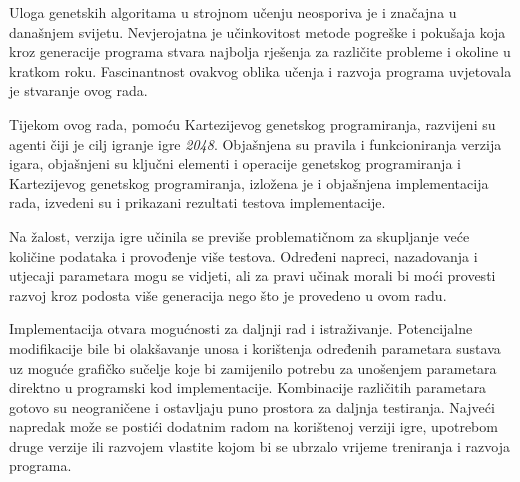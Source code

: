 \quad Uloga genetskih algoritama u strojnom učenju neosporiva je i značajna u današnjem svijetu. Nevjerojatna je učinkovitost  metode pogreške i pokušaja koja kroz generacije programa stvara najbolja rješenja za različite probleme i okoline u kratkom roku. Fascinantnost ovakvog oblika učenja i razvoja programa uvjetovala je stvaranje ovog rada. 
\par 
Tijekom ovog rada, pomoću Kartezijevog genetskog programiranja, razvijeni su agenti čiji je cilj igranje igre \textit{2048}. Objašnjena su pravila i funkcioniranja verzija igara, objašnjeni su ključni elementi i operacije genetskog programiranja i Kartezijevog genetskog programiranja, izložena je i objašnjena implementacija rada, izvedeni su i prikazani rezultati testova implementacije.
\par 
Na žalost, verzija igre učinila se previše problematičnom za skupljanje veće količine podataka i provođenje više testova. Određeni napreci, nazadovanja i utjecaji parametara mogu se vidjeti, ali za pravi učinak morali bi moći provesti razvoj kroz podosta više generacija nego što je provedeno u ovom radu. 
\par
Implementacija otvara mogućnosti za daljnji rad i istraživanje. Potencijalne modifikacije bile bi olakšavanje unosa i korištenja određenih parametara sustava uz moguće grafičko sučelje koje bi zamijenilo potrebu za unošenjem parametara direktno u programski kod implementacije. Kombinacije različitih parametara gotovo su neograničene i ostavljaju puno prostora za daljnja testiranja. Najveći napredak može se postići dodatnim radom na korištenoj verziji igre, upotrebom druge verzije ili razvojem vlastite kojom bi se ubrzalo vrijeme treniranja i razvoja programa. 